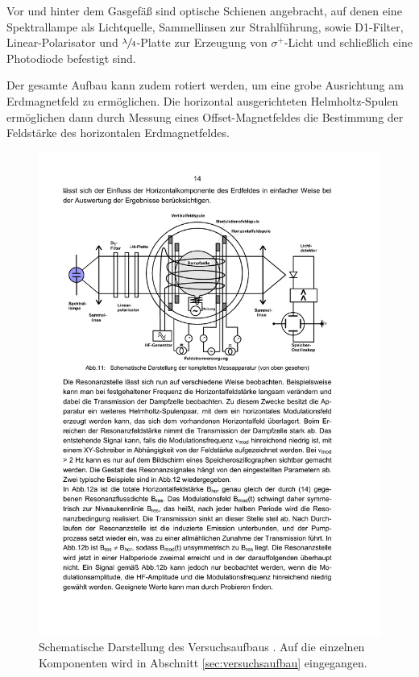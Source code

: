 Vor und hinter dem Gasgefäß sind optische Schienen angebracht, auf denen eine
Spektrallampe als Lichtquelle, Sammellinsen zur Strahlführung, sowie D1-Filter,
Linear-Polarisator und $\sfrac{\lambda}{4}$-Platte zur Erzeugung von
$\sigma^+$-Licht und schließlich eine Photodiode befestigt sind.

Der gesamte Aufbau kann zudem rotiert werden, um eine grobe Ausrichtung am
Erdmagnetfeld zu ermöglichen. Die horizontal ausgerichteten Helmholtz-Spulen
ermöglichen dann durch Messung eines Offset-Magnetfeldes die Bestimmung der
Feldstärke des horizontalen Erdmagnetfeldes.
\begin{figure}
    \centering
    \includegraphics[width=0.9\linewidth]{img/aufbau}
    \caption{
        Schematische Darstellung des Versuchsaufbaus \cite{V21}. Auf die
        einzelnen Komponenten wird in Abschnitt \ref{sec:versuchsaufbau}
        eingegangen.
    }
    \label{fig:aufbau}
\end{figure}
